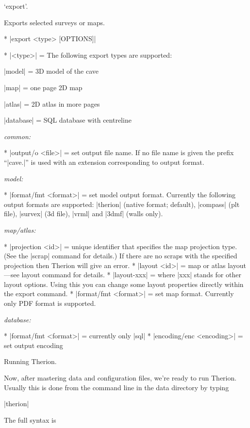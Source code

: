 \subsubchapter `export'.

\description
  Exports selected surveys or maps. 
\enddescription

\syntax
  \list
    * |export <type> [OPTIONS]| 
  \endlist
\endsyntax

\arguments
  * |<type>| = The following export types are supported:

    |model| = 3D model of the cave

    |map| = one page 2D map

    |atlas| = 2D atlas in more pages

    |database| = SQL database with centreline
\endarguments


\options
  {\it common:}

  * |output/o <file>| = set output file name. If no file name is
    given the prefix ``|cave.|'' is used with an extension corresponding to
    output format.

  {\it model:}

  * |format/fmt <format>| = set model output format. Currently the following
    output formats are supported: |therion| (native format; default),
    |compass| (plt file), |survex| (3d file), |vrml| and |3dmf| (walls only).

  {\it map/atlas:}
  
  * |projection <id>| = unique identifier that specifies the map projection type.
    (See the |scrap| command for details.) If there are no scraps with 
    the specified projection then Therion will give an error. 
  * |layout <id>| = map or atlas layout---see layout command for details.
  * |layout-xxx| = where |xxx| stands for other layout options. Using this
    you can change some layout properties directly within the export command.
  * |format/fmt <format>| = set map format. Currently only PDF format
    is supported.

  {\it database:}
  
  * |format/fmt <format>| = currently only |sql|
  * |encoding/enc <encoding>| = set output encoding
\endoptions



\subchapter Running Therion.

Now, after mastering data and configuration files, we're ready to run Therion. 
Usually this is done from the command line in the data directory by typing

|therion|

The full syntax is

